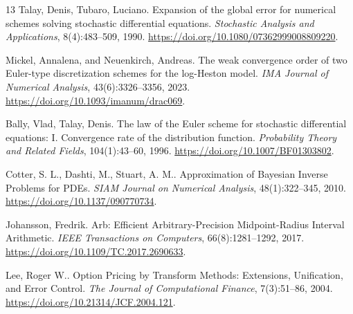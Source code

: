 \documentclass[11pt,a4paper]{article}
\begin{document}
\begin{thebibliography}{13}
Talay, Denis, Tubaro, Luciano.
Expansion of the global error for numerical schemes solving stochastic differential equations.
\emph{Stochastic Analysis and Applications}, 8(4):483--509, 1990.
\url{https://doi.org/10.1080/07362999008809220}.

Mickel, Annalena, and Neuenkirch, Andreas.
The weak convergence order of two {Euler}-type discretization schemes for the log-{Heston} model.
\emph{IMA Journal of Numerical Analysis}, 43(6):3326--3356, 2023.
\url{https://doi.org/10.1093/imanum/drac069}.

Bally, Vlad, Talay, Denis.
The law of the {Euler} scheme for stochastic differential equations: {I}. {Convergence} rate of the distribution function.
\emph{Probability Theory and Related Fields}, 104(1):43--60, 1996.
\url{https://doi.org/10.1007/BF01303802}.

Cotter, S. L., Dashti, M., Stuart, A. M..
Approximation of {Bayesian} Inverse Problems for {PDEs}.
\emph{SIAM Journal on Numerical Analysis}, 48(1):322--345, 2010.
\url{https://doi.org/10.1137/090770734}.

Johansson, Fredrik.
{Arb}: Efficient Arbitrary-Precision Midpoint-Radius Interval Arithmetic.
\emph{IEEE Transactions on Computers}, 66(8):1281--1292, 2017.
\url{https://doi.org/10.1109/TC.2017.2690633}.

Lee, Roger W..
Option Pricing by Transform Methods: Extensions, Unification, and Error Control.
\emph{The Journal of Computational Finance}, 7(3):51--86, 2004.
\url{https://doi.org/10.21314/JCF.2004.121}.

\end{thebibliography}
\end{document}
